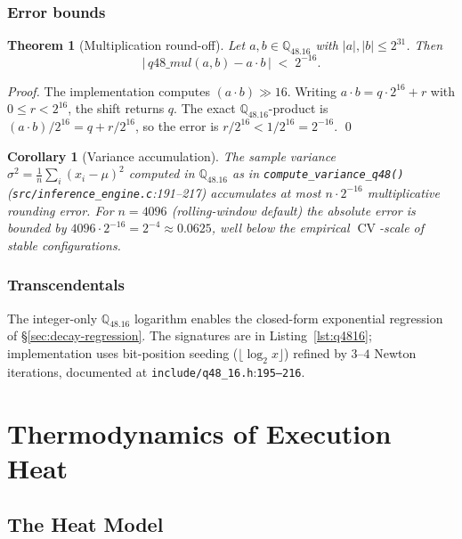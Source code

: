 \documentclass[11pt,letterpaper,openany]{book}
\theoremstyle{definition}
\theoremstyle{plain}
\newtheorem{theorem}[definition]{Theorem}
\newtheorem{corollary}[definition]{Corollary}
\newcommand{\Qfp}{\mathbb{Q}_{48.16}}                %
\newcommand{\CV}{\operatorname{CV}}
\newcommand{\sourceref}[2]{\texttt{#1}:\texttt{#2}}
\begin{document}
\section{Error bounds}

\begin{theorem}[Multiplication round-off]\label{thm:q4816-round}
Let $a, b \in \Qfp$ with $|a|,|b|\le 2^{31}$. Then
\[
  \bigl|\, q48\_mul(a,b) - a\!\cdot\!b \,\bigr| \;<\; 2^{-16}.
\]
\end{theorem}

\begin{proof}
The implementation computes $(a\cdot b) \gg 16$. Writing $a\cdot b =
q\cdot 2^{16} + r$ with $0 \le r < 2^{16}$, the shift returns $q$. The
exact $\Qfp$-product is $(a\cdot b)/2^{16} = q + r/2^{16}$, so the error
is $r/2^{16} < 1/2^{16} = 2^{-16}$. \qed
\end{proof}

\begin{corollary}[Variance accumulation]\label{cor:variance-acc}
The sample variance $\sigma^2 = \frac{1}{n}\sum_i (x_i-\mu)^2$ computed in
$\Qfp$ as in \texttt{compute\_variance\_q48()}
(\texttt{src/inference\_engine.c}:191--217) accumulates at most
$n\cdot 2^{-16}$ multiplicative rounding error. For $n=4096$
(rolling-window default) the absolute error is bounded by
$4096\cdot 2^{-16} = 2^{-4} \approx 0.0625$, well below the empirical
$\CV$-scale of stable configurations.
\end{corollary}

\section{Transcendentals}

The integer-only $\Qfp$ logarithm enables the closed-form exponential
regression of \S\ref{sec:decay-regression}. The signatures are in
Listing~\ref{lst:q4816}; implementation uses bit-position seeding
($\lfloor\log_2 x\rfloor$) refined by $3$--$4$ Newton iterations,
documented at \sourceref{include/q48\_16.h}{195--216}.

\part{Thermodynamics of Execution Heat}

\chapter{The Heat Model}
\label{ch:heat}
\end{document}
